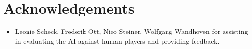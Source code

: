 \documentclass[12pt]{article}
\begin{document}
\newpage
\section*{Acknowledgements}
\begin{itemize}
\item Leonie Scheck, Frederik Ott, Nico Steiner, Wolfgang Wandhoven for assisting in evaluating the AI against human players and providing feedback.
\end{itemize}

\newpage
{}


\end{document}
